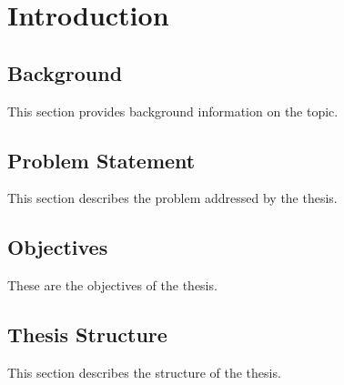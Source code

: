 \chapter{Introduction}
\label{chap:introduction}

\section{Background}
This section provides background information on the topic.

\section{Problem Statement}
This section describes the problem addressed by the thesis.

\section{Objectives}
These are the objectives of the thesis.

\section{Thesis Structure}
This section describes the structure of the thesis.
